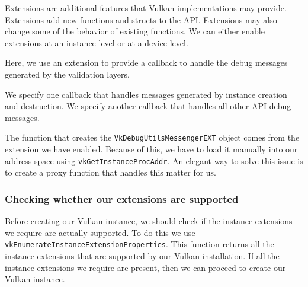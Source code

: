 Extensions are  additional features that Vulkan implementations may provide.
Extensions add new functions and structs to the API.
Extensions may also change some of the behavior of existing functions.
We can either enable extensions at an instance level or at a device level.

Here, we use an extension to provide a callback to handle the debug messages
generated by the validation layers.

\begin{minipage}{\linewidth}{\noindent}
    
\end{minipage}

We specify one callback that handles messages generated by
instance creation and destruction.
We specify another callback that handles all other API debug messages.

\begin{minipage}{\linewidth}{\noindent}
    
\end{minipage}

The function that creates the \texttt{VkDebugUtilsMessengerEXT} object comes from the
extension we have enabled.
Because of this, we have to load it manually into our address space using
\texttt{vkGetInstanceProcAddr}.
An elegant way to solve this issue is to create a proxy function that handles
this matter for us.

\begin{minipage}{\linewidth}{\noindent}
    
\end{minipage}

\subsubsection{Checking whether our extensions are supported}

Before creating our Vulkan instance, we should check if the instance extensions
we require are actually supported.
To do this we use \texttt{vkEnumerateInstanceExtensionProperties}.
This function returns all the instance extensions that are supported by our
Vulkan installation.
If all the instance extensions we require are present, then we can proceed to
create our Vulkan instance.

